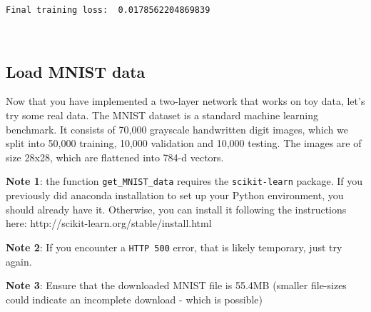 \documentclass[11pt]{article}
\begin{document}
    \begin{Verbatim}[commandchars=\\\{\}]
Final training loss:  0.0178562204869839

    \end{Verbatim}

    \begin{center}
    \end{center}
    { \hspace*{\fill} \\}
    
    \hypertarget{load-mnist-data}{%
\subsection{Load MNIST data}\label{load-mnist-data}}

Now that you have implemented a two-layer network that works on toy
data, let's try some real data. The MNIST dataset is a standard machine
learning benchmark. It consists of 70,000 grayscale handwritten digit
images, which we split into 50,000 training, 10,000 validation and
10,000 testing. The images are of size 28x28, which are flattened into
784-d vectors.

\textbf{Note 1}: the function \texttt{get\_MNIST\_data} requires the
\texttt{scikit-learn} package. If you previously did anaconda
installation to set up your Python environment, you should already have
it. Otherwise, you can install it following the instructions here:
http://scikit-learn.org/stable/install.html

\textbf{Note 2}: If you encounter a \texttt{HTTP\ 500} error, that is
likely temporary, just try again.

\textbf{Note 3}: Ensure that the downloaded MNIST file is 55.4MB
(smaller file-sizes could indicate an incomplete download - which is
possible)
\end{document}
